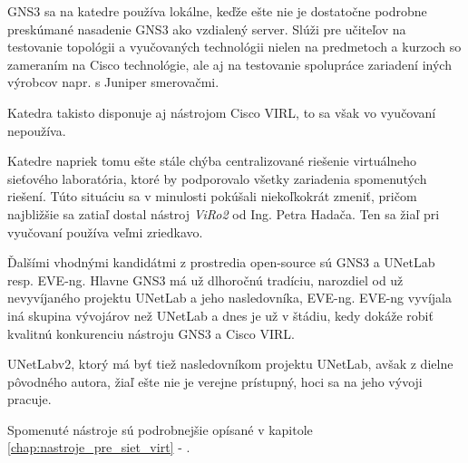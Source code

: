 GNS3 sa na katedre používa lokálne, keďže ešte nie je dostatočne podrobne preskúmané nasadenie GNS3 ako vzdialený server. Slúži pre učiteľov na testovanie topológii a vyučovaných technológii nielen na predmetoch a kurzoch so zameraním na Cisco technológie, ale aj na testovanie spolupráce zariadení iných výrobcov napr. s Juniper smerovačmi.

Katedra takisto disponuje aj nástrojom Cisco VIRL, to sa však vo vyučovaní nepoužíva.

Katedre napriek tomu ešte stále chýba centralizované riešenie virtuálneho sieťového laboratória, ktoré by podporovalo všetky zariadenia spomenutých riešení. Túto situáciu sa v minulosti pokúšali niekoľkokrát zmeniť, pričom najbližšie sa zatiaľ dostal nástroj \emph{ViRo2} od Ing. Petra Hadača. Ten sa žiaľ pri vyučovaní používa veľmi zriedkavo.

Ďalšími vhodnými kandidátmi z prostredia open-source sú GNS3 a UNetLab resp. EVE-ng. Hlavne GNS3 má už dlhoročnú tradíciu, narozdiel od už nevyvíjaného projektu UNetLab a jeho nasledovníka, EVE-ng. EVE-ng vyvíjala iná skupina vývojárov než UNetLab a dnes je už v štádiu, kedy dokáže robiť kvalitnú konkurenciu nástroju GNS3 a Cisco VIRL.

UNetLabv2, ktorý má byť tiež nasledovníkom projektu UNetLab, avšak z dielne pôvodného autora, žiaľ ešte nie je verejne prístupný, hoci sa na jeho vývoji pracuje.

Spomenuté nástroje sú podrobnejšie opísané v kapitole \ref{chap:nastroje_pre_siet_virt} - .